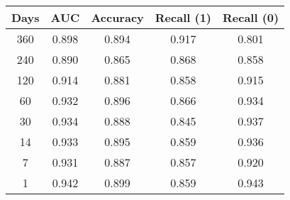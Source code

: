 \begin{tabular}{||c c c c c||}
\hline
Days & AUC & Accuracy & Recall (1) & Recall (0) \\
\hline\hline
360 & 0.898 & 0.894 & 0.917 & 0.801 \\
240 & 0.890 & 0.865 & 0.868 & 0.858 \\
120 & 0.914 & 0.881 & 0.858 & 0.915 \\
60 & 0.932 & 0.896 & 0.866 & 0.934 \\
30 & 0.934 & 0.888 & 0.845 & 0.937 \\
14 & 0.933 & 0.895 & 0.859 & 0.936 \\
7 & 0.931 & 0.887 & 0.857 & 0.920 \\
1 & 0.942 & 0.899 & 0.859 & 0.943 \\
\hline
\end{tabular}
